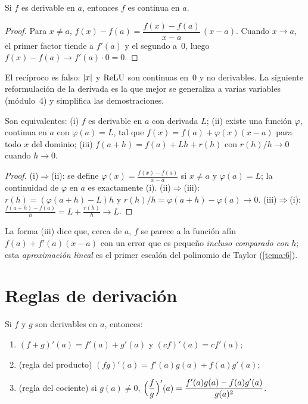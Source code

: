 \begin{teorema}\label{teo:derivable-continua}
Si $f$ es derivable en $a$, entonces $f$ es continua en $a$.
\end{teorema}

\begin{proof}
Para $x\ne a$, $f(x)-f(a)=\dfrac{f(x)-f(a)}{x-a}\,(x-a)$. Cuando $x\to a$, el primer factor tiende a $f'(a)$ y el segundo a~0, luego $f(x)-f(a)\to f'(a)\cdot0=0$.
\end{proof}

El recíproco es falso: $\lvert x\rvert$ y $\operatorname{ReLU}$ son continuas en~0 y no derivables. La siguiente reformulación de la derivada es la que mejor se generaliza a varias variables (módulo~4) y simplifica las demostraciones.

\begin{proposicion}\label{prop:caratheodory}
Son equivalentes: (i) $f$ es derivable en $a$ con derivada $L$; (ii) existe una función $\varphi$, continua en $a$ con $\varphi(a)=L$, tal que $f(x)=f(a)+\varphi(x)(x-a)$ para todo $x$ del dominio; (iii) $f(a+h)=f(a)+Lh+r(h)$ con $r(h)/h\to0$ cuando $h\to0$.
\end{proposicion}

\begin{proof}
(i)$\Rightarrow$(ii): se define $\varphi(x)=\frac{f(x)-f(a)}{x-a}$ si $x\ne a$ y $\varphi(a)=L$; la continuidad de $\varphi$ en $a$ es exactamente (i). (ii)$\Rightarrow$(iii): $r(h)=(\varphi(a+h)-L)h$ y $r(h)/h=\varphi(a+h)-\varphi(a)\to0$. (iii)$\Rightarrow$(i): $\frac{f(a+h)-f(a)}{h}=L+\frac{r(h)}{h}\to L$.
\end{proof}

La forma (iii) dice que, cerca de $a$, $f$ se parece a la función afín $f(a)+f'(a)(x-a)$ con un error que es pequeño \emph{incluso comparado con} $h$; esta \emph{aproximación lineal} es el primer escalón del polinomio de Taylor (\cref{tema:6}).

\section{Reglas de derivación}

\begin{teorema}\label{teo:reglas}
Si $f$ y $g$ son derivables en $a$, entonces:
\begin{enumerate}
  \item $(f+g)'(a)=f'(a)+g'(a)$ y $(cf)'(a)=cf'(a)$;
  \item (regla del producto) $(fg)'(a)=f'(a)g(a)+f(a)g'(a)$;
  \item (regla del cociente) si $g(a)\ne0$, $\Bigl(\dfrac fg\Bigr)'(a)=\dfrac{f'(a)g(a)-f(a)g'(a)}{g(a)^{2}}$.
\end{enumerate}
\end{teorema}

